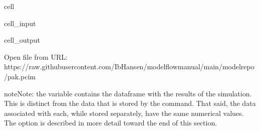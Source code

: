 \documentclass[letterpaper,10pt,english]{jupyterBook}
\begin{document}
\begin{sphinxuseclass}{cell}\begin{sphinxVerbatimInput}

\begin{sphinxuseclass}{cell_input}
\begin{sphinxVerbatim}[commandchars=\\\{\}]
   \PYGZbs{}
                                 
\end{sphinxVerbatim}

\end{sphinxuseclass}\end{sphinxVerbatimInput}
\begin{sphinxVerbatimOutput}

\begin{sphinxuseclass}{cell_output}
\begin{sphinxVerbatim}[commandchars=\\\{\}]
Open file from URL:  https://raw.githubusercontent.com/IbHansen/modelflow\PYGZhy{}manual/main/model\PYGZus{}repo/pak.pcim
\end{sphinxVerbatim}

\end{sphinxuseclass}\end{sphinxVerbatimOutput}

\end{sphinxuseclass}
\begin{sphinxadmonition}{note}{Note:}
\sphinxAtStartPar
the variable  contains the dataframe with the results of the simulation.  This is distinct from the data that is stored by the  command. That said, the data associated with each, while stored separately, have the same numerical values. The  option is described in more detail toward the end of this section.
\end{sphinxadmonition}
\end{document}
